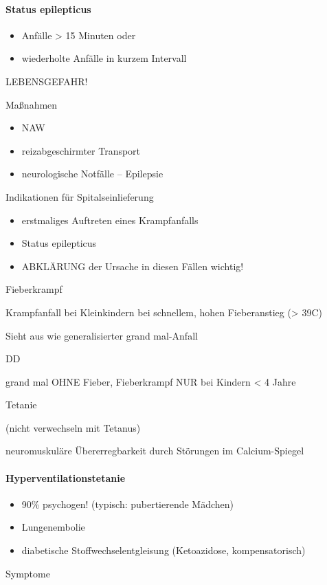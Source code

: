 \documentclass{article}
\begin{document}
\paragraph{Status epilepticus }
\begin{itemize}
\item Anf\"alle {\textgreater} 15 Minuten oder

\item wiederholte Anf\"alle in kurzem Intervall

\end{itemize}
LEBENSGEFAHR!

Ma{\ss}nahmen

\begin{itemize}
\item NAW

\item reizabgeschirmter Transport

\item neurologische Notf\"alle -- Epilepsie

\end{itemize}
Indikationen f\"ur Spitalseinlieferung

\begin{itemize}
\item erstmaliges Auftreten eines Krampfanfalls

\item Status epilepticus

\item ABKL\"ARUNG  der Ursache in diesen  F\"allen wichtig!

\end{itemize}
Fieberkrampf

Krampfanfall bei Kleinkindern bei schnellem, hohen Fieberanstieg
({\textgreater} 39{\textdegree}C)

Sieht aus wie generalisierter grand mal-Anfall

DD

grand mal OHNE Fieber, Fieberkrampf  NUR bei Kindern {\textless} 4 Jahre

Tetanie 

(nicht verwechseln mit Tetanus)

neuromuskul\"are \"Ubererregbarkeit durch  St\"orungen im
Calcium-Spiegel

\paragraph{Hyperventilationstetanie }
\begin{itemize}
\item 90\% psychogen! (typisch: pubertierende  M\"adchen)

\item Lungenembolie

\item diabetische Stoffwechselentgleisung (Ketoazidose, kompensatorisch)

\end{itemize}
Symptome
\end{document}
